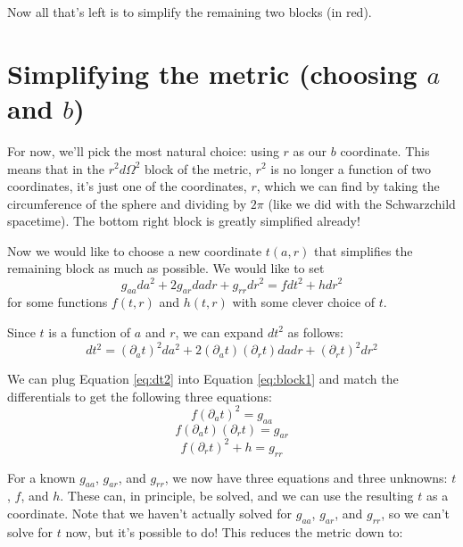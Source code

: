 \documentclass[11pt,table]{article}
\begin{document}
Now all that's left is to simplify the remaining two blocks (in red).

\section{Simplifying the metric (choosing $a$ and $b$)}

For now, we'll pick the most natural choice: using $r$ as our $b$ coordinate.
This means that in the $r^2d\Omega^2$ block of the metric, $r^2$ is no longer a function of two coordinates, it's just one of the coordinates, $r$, which we can find by taking the circumference of the sphere and dividing by $2\pi$ (like we did with the Schwarzchild spacetime).
The bottom right block is greatly simplified already!

Now we would like to choose a new coordinate $t(a,r)$ that simplifies the remaining block as much as possible. We would like to set
\begin{equation}\label{eq:block1}
  g_{aa}da^2 + 2g_{ar}dadr + g_{rr}dr^2 = fdt^2 + hdr^2
\end{equation}
for some functions $f(t,r)$ and $h(t,r)$ with some clever choice of $t$.

Since $t$ is a function of $a$ and $r$, we can expand $dt^2$ as follows:
\begin{equation}\label{eq:dt2}
   dt^2 = (\partial_a t)^2 da^2 + 2(\partial_a t)(\partial_r t)dadr + (\partial_r t)^2 dr^2
\end{equation}

We can plug Equation \ref{eq:dt2} into Equation \ref{eq:block1} and match the differentials to get the following three equations:
\begin{equation}\label{eq:da2}
  f(\partial_a t)^2 = g_{aa}
\end{equation}
\begin{equation}\label{eq:dadr}
  f(\partial_a t)(\partial_r t) = g_{ar}
\end{equation}
\begin{equation}\label{eq:dr2}
  f(\partial_r t)^2 + h = g_{rr}
\end{equation}

For a known $g_{aa}$, $g_{ar}$, and $g_{rr}$, we now have three equations and three unknowns: $t$, $f$, and $h$.
These can, in principle, be solved, and we can use the resulting $t$ as a coordinate. Note that we haven't actually solved for $g_{aa}$, $g_{ar}$, and $g_{rr}$, so we can't solve for $t$ now, but it's possible to do! This reduces the metric down to:
\end{document}
